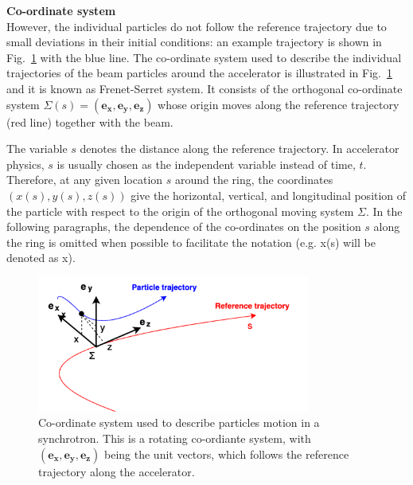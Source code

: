 
\textbf{Co-ordinate system}\\
However, the individual particles do not follow the reference trajectory due to small deviations in their initial conditions: an example trajectory is shown in Fig.~\ref{fig:coordinate_system} with the blue line. The co-ordinate system used to describe the individual trajectories of the beam particles around the accelerator is illustrated in Fig.~\ref{fig:coordinate_system} and it is known as Frenet-Serret system.  It consists of the orthogonal co-ordinate system $\Sigma(s) = (\mathbf{e_x}, \mathbf{e_y}, \mathbf{e_z})$ whose origin moves along the reference trajectory (red line) together with the beam. 

The variable $s$ denotes the distance along the reference trajectory. In accelerator physics, $s$ is usually chosen as the independent variable instead of time, $t$.  %
Therefore, at any given location $s$ around the ring, the coordinates $(x(s), y(s), z(s))$ give the horizontal, vertical, and longitudinal position of the particle with respect to the origin of the orthogonal moving system $\Sigma$. In the following paragraphs, the dependence of the co-ordinates on the position $s$ along the ring is omitted when possible to facilitate the notation (e.g. x(s) will be denoted as x).

\begin{figure}[!h] %
    \centering         
    \includegraphics[width=0.8\textwidth]{images/Ch2/coordinates_particle_motion.png}
        \caption{Co-ordinate system used to describe particles motion in a synchrotron. This is a rotating co-ordiante system, with $(\mathbf{e_x, e_y, e_z})$ being the unit vectors, which follows the reference trajectory along the accelerator.}
        \label{fig:coordinate_system}
 \end{figure}


